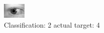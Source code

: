 \begin{figure}[h!]
\begin{center}
\includegraphics[width=0.60\columnwidth]{figures/ID835_class_2_target_4.png}
\end{center}
\caption{ Classification: 2 actual target: 4}
\label{fig:ID835_class_2_target_4}
\end{figure}

